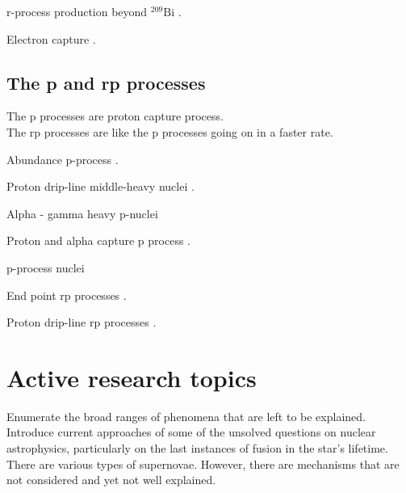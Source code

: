 \documentclass[openany]{book}
\begin{document}
r-process production beyond $\mathrm{{}^{209}Bi}$ \cite{qian_vogel_wasserburg_1999}.

Electron capture \cite{langanke_martinez-pinedo_zegers_2021}.



\subsection{The p and rp processes} \label{sub:pProcesses}

The p processes are proton capture process.\\

The rp processes are like the p processes going on in a faster rate.

Abundance p-process \cite{delaeter_2008}.

Proton drip-line middle-heavy nuclei \cite{cai_chen_yuan_jian-jun_2022}.

Alpha - gamma heavy p-nuclei \cite{kiss_szucs_gyurky_fulop_farkas_kertesz_somorjai_laubenstein_frohlich_rauscher_et_2011} 

Proton and alpha capture p process \cite{harissopulos_lagoyannis_spyrou_zarkadas_galanopoulos_perdikakis_becker_rolfs_strieder_kunz_et_2005} \cite{harissopulos_spyrou_lagoyannis_zarkadas_becker_rolfs_strieder_hammer_dewald_zell_et_2005}.

p-process nuclei 
\cite{quinn_spyrou_simon_battaglia_couder_deyoung_dombos_fang_gosrres_kontos_et_2013}

End point rp processes  \cite{schatz_aprahamian_barnard_bildsten_cumming_ouellette_rauscher_thielemann_wiescher_2001}.

Proton drip-line rp processes \cite{brown_clement_schatz_volya_richter_2002}.

\section{Active research topics} \label{sec:activeResearch}

Enumerate the broad ranges of phenomena that are left to be explained.  \\

Introduce current approaches of some of the unsolved questions on nuclear astrophysics, particularly on the last instances of fusion in the star's lifetime. \\

There are various types of  supernovae. However, there are mechanisms that are not considered and yet not well explained. \\
\end{document}
